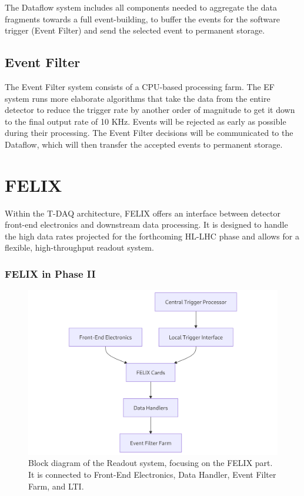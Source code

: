 The Dataflow system \cite{tdaq} includes all components needed to aggregate the data fragments towards a full event-building, to buffer the events for the software trigger (Event Filter) and send the selected event to permanent storage.

\subsection{Event Filter}

The Event Filter system \cite{tdaq} consists of a CPU-based processing farm. The \acs{EF} system runs more elaborate algorithms that take the data from the entire detector to reduce the trigger rate by another order of magnitude to get it down to the final output rate of 10 KHz. Events will be rejected as early as possible during their processing. The Event Filter decisions will be communicated to the Dataflow, which will then transfer the accepted events to permanent storage.

\clearpage
\section{\acs{FELIX}}

Within the \acs{T-DAQ} architecture, \acs{FELIX} offers an interface between detector front-end electronics and downstream data processing. It is designed to handle the high data rates projected for the forthcoming HL-LHC phase and allows for a flexible, high-throughput readout system.

\subsubsection{\acs{FELIX} in Phase II}

\begin{figure}[H]
\centering
\includegraphics[width=\textwidth]{images/introduction/felix-block-diagram.png}
\caption[Block diagram of the Readout system]{Block diagram of the Readout system, focusing on the FELIX part. It is connected to Front-End Electronics, Data Handler, Event Filter Farm, and \acf{LTI}.}
\label{fig:felix-block-diagram}
\end{figure}

